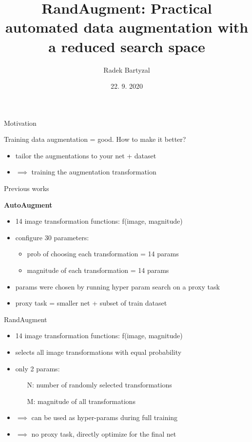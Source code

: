 \documentclass{beamer}
\begin{document}
\title[BigBird]{RandAugment: Practical automated data augmentation with a reduced search space}  
\author{Radek Bartyzal}
\date{22. 9. 2020} 

\frame{\titlepage} 

\begin{frame}{Motivation}

Training data augmentation = good.
\vfill
How to make it better?

\begin{itemize}
\item tailor the augmentations to your net + dataset
\item $\implies$ training the augmentation transformation 
\end{itemize}

\end{frame}
\begin{frame}{Previous works}

\textbf{AutoAugment} \cite{cit:auto}
\begin{itemize}
\item 14 image transformation functions: f(image, magnitude)
\item configure 30 parameters:
\begin{itemize}
\item prob of choosing each transformation = 14 params
\item magnitude of each transformation = 14 params
\end{itemize}
\item params were chosen by running hyper param search on a proxy task
\item proxy task = smaller net + subset of train dataset
\end{itemize}
\end{frame}
\begin{frame}{RandAugment}

\begin{itemize}
\item 14 image transformation functions: f(image, magnitude)
\item selects all image transformations with
equal probability
\item only 2 params:
\begin{itemize}
\item[N:] number of randomly selected transformations
\item[M:] magnitude of all transformations
\end{itemize}
\item $\implies$ can be used as hyper-params during full training
\item $\implies$ no proxy task, directly optimize for the final net
\end{itemize}

\end{frame}
\end{document}
